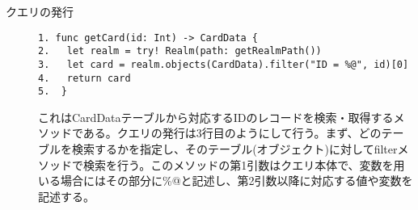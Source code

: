  \begin{description}
\item[クエリの発行]\mbox{} 
\begin{lstlisting}[basicstyle=\ttfamily\footnotesize, frame=single]
1. func getCard(id: Int) -> CardData {
2.   let realm = try! Realm(path: getRealmPath())
3.   let card = realm.objects(CardData).filter("ID = %@", id)[0]
4.   return card
5.  }
 \end{lstlisting}
 
これはCardDataテーブルから対応するIDのレコードを検索・取得するメソッドである。クエリの発行は3行目のようにして行う。まず、どのテーブルを検索するかを指定し、そのテーブル(オブジェクト)に対してfilterメソッドで検索を行う。このメソッドの第1引数はクエリ本体で、変数を用いる場合にはその部分に\%@と記述し、第2引数以降に対応する値や変数を記述する。
\end{description}


